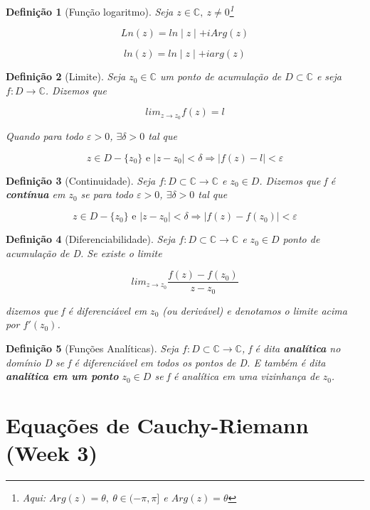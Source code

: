 \documentclass{article}
\newtheorem{definition}{Definição}
\begin{document}
\begin{definition}[Função logaritmo]
Seja $z \in \mathbb{C},\ z \neq 0$\footnote{Aqui: $Arg(z) = \theta,\ \theta \in (-\pi,\pi]$ e $Arg(z) = \theta$}

$$Ln(z) = ln \mid z \mid + i Arg(z)$$

$$ln(z) = ln \mid z \mid + i arg(z)$$
\end{definition}

\begin{definition}[Limite]
Seja $z_0 \in \mathbb{C}$ um ponto de acumulação de $D \subset \mathbb{C}$ e seja $f: D \rightarrow \mathbb{C}$. Dizemos que

$$lim_{z \rightarrow z_0} f(z) = l$$

Quando para todo $\varepsilon > 0$, $\exists \delta > 0$ tal que 

$$z \in D - \{z_0\} \text{ e } | z - z_0| < \delta \Longrightarrow{} | f(z) - l | < \varepsilon$$
\end{definition}

\begin{definition}[Continuidade]
Seja $f: D \subset \mathbb{C} \rightarrow \mathbb{C}$ e $z_0 \in D$. Dizemos que f é \textbf{contínua} em $z_0$ se para todo $\varepsilon > 0$, $\exists \delta > 0$ tal que

$$z \in D - \{z_0\} \text{ e } | z - z_0 | < \delta \Longrightarrow{} | f(z) - f(z_0) | < \varepsilon$$
\end{definition}

\begin{definition}[Diferenciabilidade]
Seja $f: D \subset \mathbb{C} \rightarrow \mathbb{C}$ e $z_0 \in D$ ponto de acumulação de D. Se existe o limite

$$lim_{z \rightarrow z_0} \frac{f(z) - f(z_0)}{z - z_0}$$

dizemos que f é diferenciável em $z_0$ (ou derivável) e denotamos o limite acima por $f'(z_0)$.
\end{definition}

\begin{definition}[Funções Analíticas]
Seja $f: D \subset \mathbb{C} \rightarrow \mathbb{C}$, f é dita \textbf{analítica} no domínio D se f é diferenciável em todos os pontos de D. E também é dita \textbf{analítica em um ponto} $z_0 \in D$ se f é analítica em uma vizinhança de $z_0$.
\end{definition}


\section*{Equações de Cauchy-Riemann (Week 3)}
\label{s3}
\end{document}
